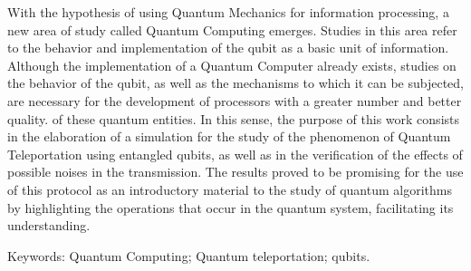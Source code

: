 \begin{resumo}[Abstract] %

  With the hypothesis of using Quantum Mechanics for information processing, a new area of ​​study called Quantum Computing emerges. Studies in this area refer to the behavior and implementation of the qubit as a basic unit of information. Although the implementation of a Quantum Computer already exists, studies on the behavior of the qubit, as well as the mechanisms to which it can be subjected, are necessary for the development of processors with a greater number and better quality.
of these quantum entities. In this sense, the purpose of this work consists in the elaboration of a simulation for the study of the phenomenon of Quantum Teleportation using entangled qubits, as well as in the verification of the effects of possible noises in the transmission. The results proved to be promising for the use of this protocol as an introductory material to the study of quantum algorithms by highlighting the operations that occur in the quantum system, facilitating its understanding.
  \vspace{\onelineskip}

  \noindent
  Keywords: Quantum Computing; Quantum teleportation; qubits.
\end{resumo}

\cleardoublepage

